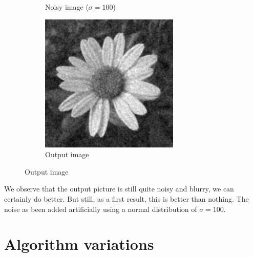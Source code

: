 \begin{figure}[H]
\begin{subfigure}[b]{0.32\textwidth}
        \caption{Noisy image (\(\sigma=100\))}
    \end{subfigure}
    \begin{subfigure}[b]{0.32\textwidth}
        \includegraphics[width=\textwidth]{img/flowerOutput.png}
        \caption{Output image}
    \end{subfigure}
\end{figure}

We observe that the output picture is still quite noisy and blurry, we can certainly do better.
But still, as a first result, this is better than nothing.
The noise as been added artificially using a normal distribution of \(\sigma = 100\).

\section{Algorithm variations}

